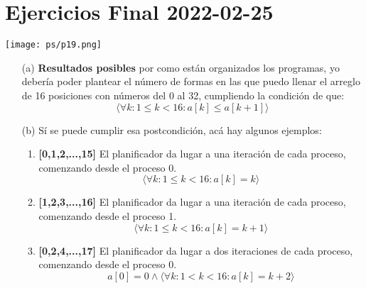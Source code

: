 \documentclass[openany]{book}
\begin{document}
\section*{Ejercicios Final 2022-02-25}
\texttt{[image: ps/p19.png]}

\begin{rta}
    \begin{itemize}
        \item[(a)] \textbf{Resultados posibles} por como están organizados los programas, yo debería poder plantear el número de formas en las que puedo llenar el arreglo de 16 posiciones con números del 0 al 32, cumpliendo la condición de que:
        \begin{equation*}
            \langle \forall k: 1 \leq k < 16: a[k] \leq a[k+1] \rangle 
        \end{equation*}
        \item[(b)] Sí se puede cumplir esa postcondición, acá hay algunos ejemplos:
        \begin{enumerate}
            \item \textbf{[0,1,2,...,15]} El planificador da lugar a una iteración de cada proceso, comenzando desde el proceso 0.
            \begin{equation*}
                \langle \forall k: 1 \leq k < 16: a[k] = k \rangle 
            \end{equation*}
            \item \textbf{[1,2,3,...,16]} El planificador da lugar a una iteración de cada proceso, comenzando desde el proceso 1.
            \begin{equation*}
                \langle \forall k: 1 \leq k < 16: a[k] = k+1 \rangle 
            \end{equation*}
            \item \textbf{[0,2,4,...,17]} El planificador da lugar a dos iteraciones de cada proceso, comenzando desde el proceso 0.
            \begin{equation*}
                a[0] = 0 \wedge \langle \forall k: 1 < k < 16: a[k] = k+2 \rangle 
            \end{equation*}
        \end{enumerate}
    \end{itemize}
\end{rta}
\end{document}
